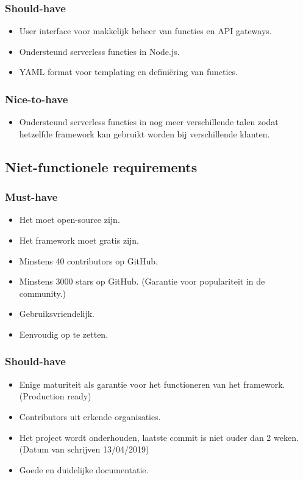 \subsubsection{Should-have}
\begin{itemize}
    \item User interface voor makkelijk beheer van functies en API gateways.
    \item Ondersteund serverless functies in Node.js.
    \item YAML format voor templating en definiëring van functies.
\end{itemize}
\subsubsection{Nice-to-have}
\begin{itemize}
    \item Ondersteund serverless functies in nog meer verschillende talen zodat hetzelfde framework kan gebruikt worden bij verschillende klanten.
\end{itemize}
\subsection{Niet-functionele requirements}
\subsubsection{Must-have}
\begin{itemize}
    \item Het moet open-source zijn.
    \item Het framework moet gratis zijn.
    \item Minstens 40 contributors op GitHub.
    \item Minstens 3000 stars op GitHub. (Garantie voor populariteit in de community.)
    \item Gebruiksvriendelijk.
    \item Eenvoudig op te zetten.
\end{itemize}
\subsubsection{Should-have}
\begin{itemize}
    \item Enige maturiteit als garantie voor het functioneren van het framework. (Production ready)
    \item Contributors uit erkende organisaties.
    \item Het project wordt onderhouden, laatste commit is niet ouder dan 2 weken. (Datum van schrijven 13/04/2019)
    \item Goede en duidelijke documentatie.
\end{itemize}
